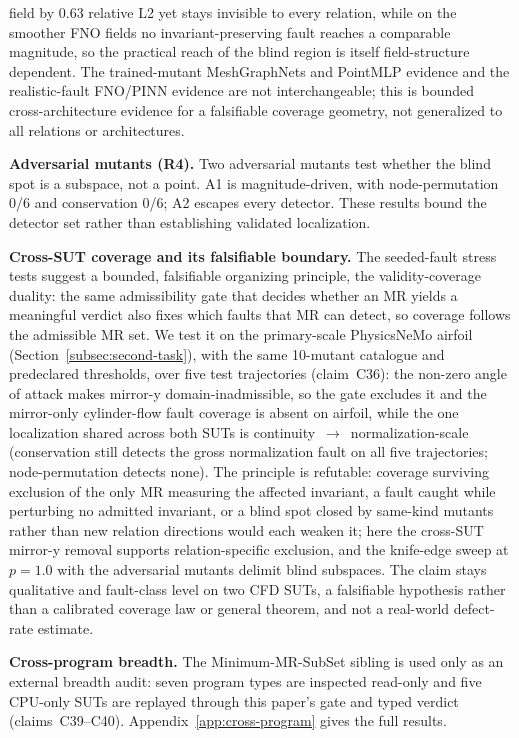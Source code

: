\documentclass[preprint,12pt]{elsarticle}
\begin{document}
field by 0.63 relative L2 yet stays invisible to every relation, while on the smoother FNO fields no invariant-preserving fault reaches a comparable magnitude, so the practical reach of the blind region is itself field-structure dependent. The trained-mutant MeshGraphNets and PointMLP evidence and the realistic-fault FNO/PINN evidence are not interchangeable; this is bounded cross-architecture evidence for a falsifiable coverage geometry, not generalized to all relations or architectures.

\textbf{Adversarial mutants (R4).} Two adversarial mutants test whether the blind spot is a subspace, not a point. A1 is magnitude-driven, with node-permutation 0/6 and conservation 0/6; A2 escapes every detector. These results bound the detector set rather than establishing validated localization.

\textbf{Cross-SUT coverage and its falsifiable boundary.} The seeded-fault stress tests suggest a bounded, falsifiable organizing principle, the validity-coverage duality: the same admissibility gate that decides whether an MR yields a meaningful verdict also fixes which faults that MR can detect, so coverage follows the admissible MR set. We test it on the primary-scale PhysicsNeMo airfoil (Section~\ref{subsec:second-task}), with the same 10-mutant catalogue and predeclared thresholds, over five test trajectories (claim~C36): the non-zero angle of attack makes mirror-y domain-inadmissible, so the gate excludes it and the mirror-only cylinder-flow fault coverage is absent on airfoil, while the one localization shared across both SUTs is continuity~$\to$~normalization-scale (conservation still detects the gross normalization fault on all five trajectories; node-permutation detects none). The principle is refutable: coverage surviving exclusion of the only MR measuring the affected invariant, a fault caught while perturbing no admitted invariant, or a blind spot closed by same-kind mutants rather than new relation directions would each weaken it; here the cross-SUT mirror-y removal supports relation-specific exclusion, and the knife-edge sweep at $p=1.0$ with the adversarial mutants delimit blind subspaces. The claim stays qualitative and fault-class level on two CFD SUTs, a falsifiable hypothesis rather than a calibrated coverage law or general theorem, and not a real-world defect-rate estimate.

\textbf{Cross-program breadth.} The Minimum-MR-SubSet sibling is used only as an external breadth audit: seven program types are inspected read-only and five CPU-only SUTs are replayed through this paper's gate and typed verdict (claims~C39--C40). Appendix~\ref{app:cross-program} gives the full results.
\end{document}

